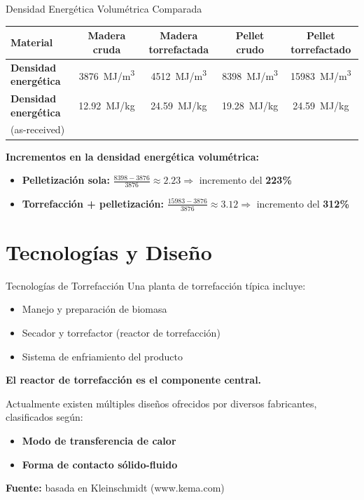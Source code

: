 \documentclass[main.tex]{subfiles}
\begin{document}
\begin{frame}{Densidad Energética Volumétrica Comparada}
\footnotesize
\begin{tabular}{lcccc}
\toprule
\textbf{Material} & \textbf{Madera cruda} & \textbf{Madera torrefactada} & \textbf{Pellet crudo} & \textbf{Pellet torrefactado} \\
\midrule
\textbf{Densidad energética} & \SI{3876}{MJ/m^3} & \SI{4512}{MJ/m^3} & \SI{8398}{MJ/m^3} & \SI{15983}{MJ/m^3} \\
\textbf{Densidad energética} & \SI{12.92}{MJ/kg} & \SI{24.59}{MJ/kg} & \SI{19.28}{MJ/kg} & \SI{24.59}{MJ/kg} \\
(as-received) & & & & \\
\bottomrule
\end{tabular}

\vspace{1em}
\textbf{Incrementos en la densidad energética volumétrica:}
\begin{itemize}
  \item \textbf{Pelletización sola:} $\frac{8398 - 3876}{3876} \approx 2.23 \Rightarrow$ incremento del \textbf{223\%}
  \item \textbf{Torrefacción + pelletización:} $\frac{15983 - 3876}{3876} \approx 3.12 \Rightarrow$ incremento del \textbf{312\%}
\end{itemize}
\end{frame}








\section{Tecnologías y Diseño}

\begin{frame}{Tecnologías de Torrefacción}
\small
Una planta de torrefacción típica incluye:
\begin{itemize}
    \item Manejo y preparación de biomasa
    \item Secador y torrefactor (reactor de torrefacción)
    \item Sistema de enfriamiento del producto
\end{itemize}

\vspace{0.5em}
\textbf{El reactor de torrefacción es el componente central.}

Actualmente existen múltiples diseños ofrecidos por diversos fabricantes, clasificados según:
\begin{itemize}
    \item \textbf{Modo de transferencia de calor}
    \item \textbf{Forma de contacto sólido-fluido}
\end{itemize}

\textbf{Fuente:} basada en Kleinschmidt (www.kema.com)
\end{frame}
\end{document}
